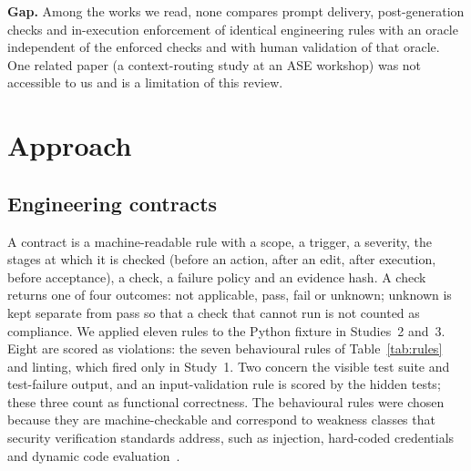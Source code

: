 \documentclass[conference]{IEEEtran}
\begin{document}
\textbf{Gap.} Among the works we read, none compares prompt delivery, post-generation checks and in-execution enforcement of identical engineering rules with an oracle independent of the enforced checks and with human validation of that oracle. One related paper (a context-routing study at an ASE workshop) was not accessible to us and is a limitation of this review.

\section{Approach}
\subsection{Engineering contracts}
A contract is a machine-readable rule with a scope, a trigger, a severity, the stages at which it is checked (before an action, after an edit, after execution, before acceptance), a check, a failure policy and an evidence hash.
A check returns one of four outcomes: not applicable, pass, fail or unknown; unknown is kept separate from pass so that a check that cannot run is not counted as compliance.
We applied eleven rules to the Python fixture in Studies~2 and~3. Eight are scored as violations: the seven behavioural rules of Table~\ref{tab:rules} and linting, which fired only in Study~1. Two concern the visible test suite and test-failure output, and an input-validation rule is scored by the hidden tests; these three count as functional correctness.
The behavioural rules were chosen because they are machine-checkable and correspond to weakness classes that security verification standards address, such as injection, hard-coded credentials and dynamic code evaluation~\cite{asvs}.
\end{document}
